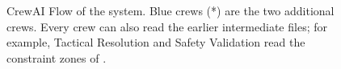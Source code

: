 \begin{figure}[H]
\caption{CrewAI Flow of the system. Blue crews (*) are the two additional crews. Every crew
can also read the earlier intermediate files; for example, Tactical Resolution and Safety
Validation read the constraint zones of .}
\label{fig:flow}
\end{figure}
